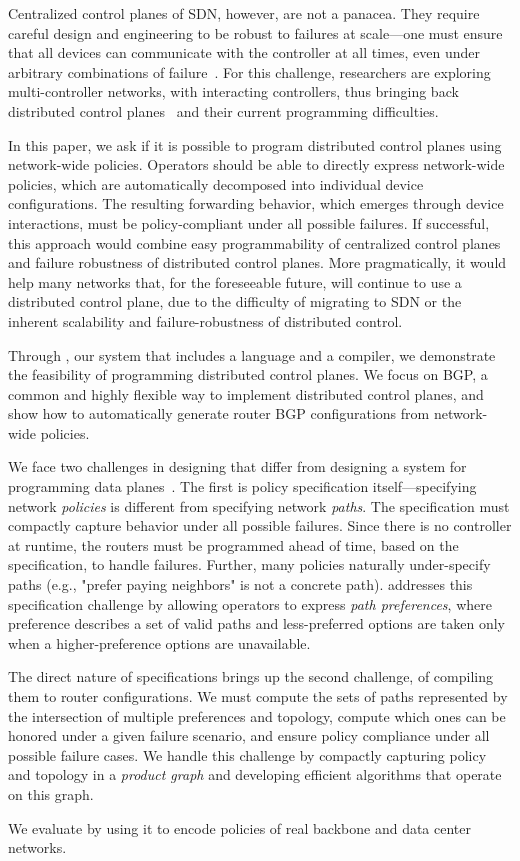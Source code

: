 Centralized control planes of SDN, however, are not a panacea.
%
They require careful design and engineering to be robust to failures at scale---one must ensure that all devices can communicate with the controller at all times, even under arbitrary combinations of failure~\cite{x,y,z}. For this challenge, researchers are exploring multi-controller networks, with interacting controllers, thus bringing back distributed control planes~\cite{x,y,z} and their current programming difficulties.

In this paper, we ask if it is possible to program distributed control planes using network-wide policies.
Operators should be able to directly express network-wide policies, which are automatically decomposed into individual device configurations. The resulting forwarding behavior, which emerges through device interactions, must be policy-compliant under all possible failures.
If successful, this approach would combine easy programmability of centralized control planes and failure robustness of distributed control planes.
%
More pragmatically, it would help many networks that, for the foreseeable future, will continue to use a distributed control plane, due to the difficulty of migrating to SDN or the inherent scalability and failure-robustness of distributed control.

Through \sysname, our system that includes a language and a compiler, we demonstrate the feasibility of programming distributed control planes. We focus on BGP, a common and highly flexible way to implement distributed control planes, and show how to automatically generate router BGP configurations from network-wide policies.

We face two challenges in designing \sysname that differ from designing a system for programming data planes~\cite{x,y,z}. The first is policy specification itself---specifying network {\em policies} is different from specifying network {\em paths}.
%
The specification must compactly capture behavior under all possible failures. Since there is no controller at runtime, the routers must be programmed ahead of time, based on the specification, to handle failures.
%
Further, many policies naturally under-specify paths (e.g., "prefer paying neighbors" is not a concrete path). 
%
\sysname addresses this specification challenge by allowing operators to express {\em path preferences}, where preference describes a set of valid paths and less-preferred options are taken only when a higher-preference options are unavailable.

The direct nature of \sysname specifications brings up the second challenge, of compiling them to router configurations.  We must compute the sets of paths represented by the intersection of multiple preferences and topology, compute which ones can be honored under a given failure scenario, and ensure policy compliance under all possible failure cases. We handle this challenge by compactly capturing policy and topology in a {\em product graph} and developing efficient algorithms that operate on this graph. 

We evaluate \sysname by using it to encode policies of real backbone and data center networks. 



